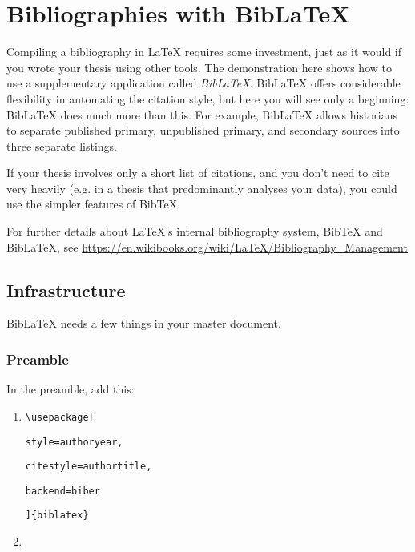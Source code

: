 %
%

\chapter{Bibliographies with BibLaTeX}

Compiling a bibliography in LaTeX requires some investment, just as it would if you wrote your thesis using other tools. The demonstration here shows how to use a supplementary application called \emph{BibLaTeX}.  BibLaTeX offers considerable flexibility in automating the citation style, but here you will see only a beginning: BibLaTeX does much more than this.  For example, BibLaTeX allows  historians to separate published primary, unpublished primary, and secondary sources into three separate listings.

If your thesis involves only a short list of citations, and you don't need to cite very heavily (e.g. in a thesis that predominantly analyses your data), you could use the simpler features of BibTeX. 

For further details about LaTeX's internal bibliography system, BibTeX and BibLaTeX, see \url{https://en.wikibooks.org/wiki/LaTeX/Bibliography_Management}


\section{Infrastructure}

BibLaTeX needs a few things in your master document. 

\subsection{Preamble}

In the preamble, add this:

\begin{enumerate}
\item \verb+\usepackage[+

	\quad\quad \verb+style=authoryear,+ 

	\quad\quad \verb+citestyle=authortitle,+
	
	\quad\quad \verb+backend=biber+

	\quad \verb+]{biblatex}+

\item \verb++
\end{enumerate}

